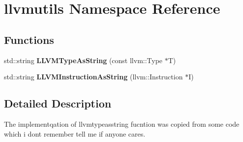 \hypertarget{namespacellvmutils}{}\section{llvmutils Namespace Reference}
\label{namespacellvmutils}
\subsection*{Functions}
\begin{DoxyCompactItemize}
\item 
\hypertarget{namespacellvmutils_a6e5b5c0df2940f93b257c942f7a6ff97}{}std\+::string {\bfseries L\+L\+V\+M\+Type\+As\+String} (const llvm\+::\+Type $\ast$T)\label{namespacellvmutils_a6e5b5c0df2940f93b257c942f7a6ff97}

\item 
\hypertarget{namespacellvmutils_a0d3766e22426ecedfe01de99ac00b7d6}{}std\+::string {\bfseries L\+L\+V\+M\+Instruction\+As\+String} (llvm\+::\+Instruction $\ast$I)\label{namespacellvmutils_a0d3766e22426ecedfe01de99ac00b7d6}

\end{DoxyCompactItemize}


\subsection{Detailed Description}
The implementqation of llvmtypeasstring fucntion was copied from some code which i don\textquotesingle{}t remember tell me if anyone cares. 